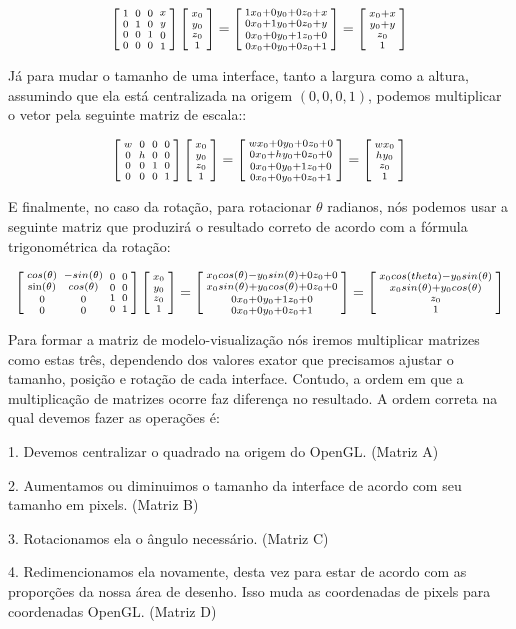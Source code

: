 $$ \left[{{1 \atop 0}\atop {0\atop 0}}{{0 \atop 1}\atop {0 \atop
      0}}{{0\atop 0}\atop{1 \atop 0}}{{x \atop y}\atop{0\atop
      1}}\right]\left[{{x_0\atop y_0}\atop {z_0\atop
      1}}\right]=\left[{{1x_0+0y_0+0z_0+x\atop 0x_0+1y_0+0z_0+y}\atop
    {0x_0+0y_0+1z_0+0\atop
      0x_0+0y_0+0z_0+1}}\right]=\left[{{x_0+x\atop y_0+y}\atop
    {z_0\atop 1}}\right]
$$

Já para mudar o tamanho de uma interface, tanto a largura como a
altura, assumindo que ela está centralizada na origem $(0, 0, 0, 1)$,
podemos multiplicar o vetor pela seguinte matriz de escala::

$$ \left[{{w \atop 0}\atop {0\atop 0}}{{0 \atop h}\atop {0 \atop
      0}}{{0\atop 0}\atop{1 \atop 0}}{{0 \atop 0}\atop{0\atop
      1}}\right]\left[{{x_0\atop y_0}\atop {z_0\atop
      1}}\right]=\left[{{wx_0+0y_0+0z_0+0\atop 0x_0+hy_0+0z_0+0}\atop
    {0x_0+0y_0+1z_0+0\atop 0x_0+0y_0+0z_0+1}}\right]=\left[{{wx_0\atop
      hy_0}\atop {z_0\atop 1}}\right]
$$

E finalmente, no caso da rotação, para rotacionar $\theta$ radianos,
nós podemos usar a seguinte matriz que produzirá o resultado correto
de acordo com a fórmula trigonométrica da rotação:

$$ \left[{{cos(\theta) \atop \sin(\theta)}\atop {0\atop
      0}}{{-sin(\theta) \atop cos(\theta)}\atop {0 \atop 0}}{{0\atop
      0}\atop{1 \atop 0}}{{0 \atop 0}\atop{0\atop
      1}}\right]\left[{{x_0\atop y_0}\atop {z_0\atop
      1}}\right]=\left[{{x_0 cos(\theta)-y_0 sin(\theta)+0z_0+0\atop
      x_0 sin(\theta)+y_0 cos(\theta)+0z_0+0}\atop
    {0x_0+0y_0+1z_0+0\atop 0x_0+0y_0+0z_0+1}}\right]=\left[{{x_0
      cos(theta) - y_0 sin(\theta) \atop x_0 sin(\theta) + y_0
      cos(\theta)}\atop {z_0\atop 1}}\right]
$$

Para formar a matriz de modelo-visualização nós iremos multiplicar
matrizes como estas três, dependendo dos valores exator que precisamos
ajustar o tamanho, posição e rotação de cada interface. Contudo, a
ordem em que a multiplicação de matrizes ocorre faz diferença no
resultado. A ordem correta na qual devemos fazer as operações é:

1. Devemos centralizar o quadrado na origem do OpenGL. (Matriz A)

2. Aumentamos ou diminuimos o tamanho da interface de acordo com seu
tamanho em pixels. (Matriz B)

3. Rotacionamos ela o ângulo necessário. (Matriz C)

4. Redimencionamos ela novamente, desta vez para estar de acordo com
as proporções da nossa área de desenho. Isso muda as coordenadas de
pixels para coordenadas OpenGL. (Matriz D)

